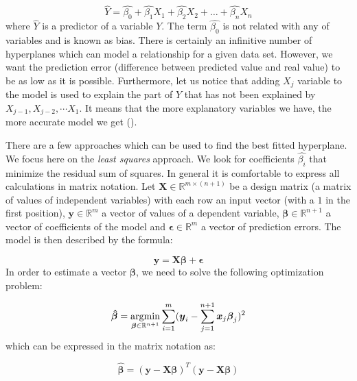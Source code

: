 \begin{equation}\label{eq:LR1}
    \hat{Y} = \hat{\beta_0} + \hat{\beta_1}X_{1} + \hat{\beta_2}X_{2} + \dots + \hat{\beta_n}X_{n}
\end{equation}
where $\hat{Y}$ is a predictor of a variable $Y$. The term $\hat{\beta_0}$ is not related with any of variables and is known as bias. 
There is certainly an infinitive number of hyperplanes which can model a relationship for a given data set. However, we want the prediction error (difference between predicted value and real value) to be as low as it is possible. Furthermore, let us notice that adding $X_j$ variable to the model is used to explain the part of $Y$ that has not been explained by $X_{j-1}, X_{j-2}, \cdots X_1$. It means that the more explanatory variables we have, the more accurate model we get (\cite{Weisberg}).

There are a few approaches which can be used to find the best fitted hyperplane. We focus here on the \textit{least squares} approach. We look for coefficients $\hat{\beta_i}$ that minimize the residual sum of squares. In general it is comfortable to express all calculations in matrix notation. Let $\boldsymbol{X} \in \mathbb{R}^{m \times (n+1)}$ be a design matrix (a matrix of values of independent variables) with each row an input vector (with a $1$ in the first position), $\boldsymbol{y} \in \mathbb{R}^{m}$ a vector of values of a dependent variable, $\boldsymbol{\beta} \in \mathbb{R}^{n+1}$ a vector of coefficients of the model and $\boldsymbol{\epsilon} \in \mathbb{R}^{m}$ a vector of prediction errors. The model is then described by the formula:

\begin{equation}\label{eq:LR1}
    \boldsymbol{y} = \boldsymbol{X}\boldsymbol{\beta} + \boldsymbol{\epsilon} 
\end{equation}
In order to estimate a vector $\boldsymbol{\beta}$, we need to solve the following optimization problem:

\begin{equation}\label{eq:LR2}
    \boldsymbol{\hat{\beta}} = \operatorname*{argmin}_{\boldsymbol{\beta} \in \mathbb{R}^{n+1}}\sum\limits_{i=1}^{m}(\boldsymbol{y}_{i}-\sum\limits_{j=1}^{n+1}\boldsymbol{x}_j\boldsymbol{\beta}_j)^2
\end{equation}
which can be expressed in the matrix notation as:

\begin{equation}\label{eq:LR3}
    \boldsymbol{\hat{\beta}} = (\boldsymbol{y}-\boldsymbol{X}\boldsymbol{\beta})^T(\boldsymbol{y}-\boldsymbol{X}\boldsymbol{\beta})
\end{equation}

